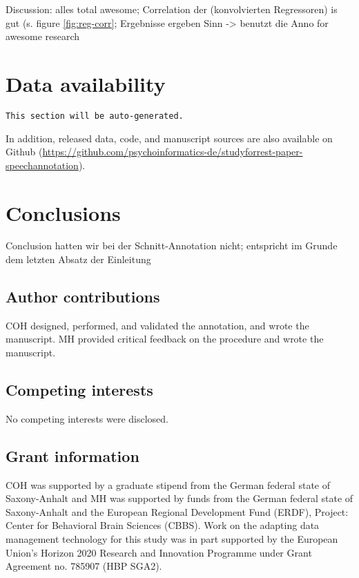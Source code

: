 \documentclass[10pt,a4paper,onecolumn]{article}
\begin{document}
Discussion: alles total awesome; Correlation der (konvolvierten Regressoren) is gut (s. figure \ref{fig:reg-corr}; Ergebnisse ergeben Sinn -> benutzt die Anno for awesome research

\section*{Data availability}
\texttt{This section will be auto-generated.}

In addition, released data, code, and manuscript sources are also available on
Github (\url{https://github.com/psychoinformatics-de/studyforrest-paper-speechannotation}).

\section*{Conclusions}
Conclusion hatten wir bei der Schnitt-Annotation nicht; entspricht im Grunde dem letzten Absatz der Einleitung


\subsection*{Author contributions}
COH designed, performed, and validated the annotation, and wrote the manuscript.
MH provided critical feedback on the procedure and wrote the manuscript.

\subsection*{Competing interests}
No competing interests were disclosed.

\subsection*{Grant information}

COH was supported by a graduate stipend from the German federal state of
Saxony-Anhalt and MH was supported by funds from the German federal state of
Saxony-Anhalt and the European Regional Development Fund (ERDF), Project:
Center for Behavioral Brain Sciences (CBBS). Work on the adapting data
management technology for this study was in part supported by the European
Union’s Horizon 2020 Research and Innovation Programme under Grant Agreement
no. 785907 (HBP SGA2).
\end{document}
